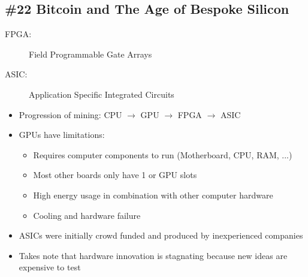 \subsection{\#22 Bitcoin and The Age of Bespoke Silicon}
\begin{description}
	\item[FPGA:] Field Programmable Gate Arrays
	\item[ASIC:] Application Specific Integrated Circuits
\end{description}
\begin{itemize}
	\item Progression of mining: CPU $\rightarrow$ GPU $\rightarrow$ FPGA $\rightarrow$ ASIC
	\item GPUs have limitations:
	\begin{itemize}
		\item Requires computer components to run (Motherboard, CPU, RAM, ...)
		\item Most other boards only have 1 or GPU slots
		\item High energy usage in combination with other computer hardware
		\item Cooling and hardware failure
	\end{itemize}
	\item ASICs were initially crowd funded and produced by inexperienced companies
	\item Takes note that hardware innovation is stagnating because new ideas are expensive to test
\end{itemize}